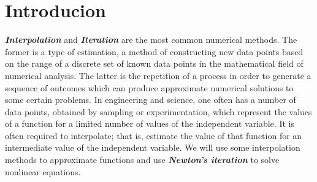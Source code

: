 \documentclass[a4paper,11pt]{article}
\begin{document}
\section{Introducion}
\textit{\textbf{Interpolation}} and \textit{\textbf{Iteration}} are the most common numerical methods. The former is a type of estimation, a method of constructing new data points based on the range of a discrete set of known data points in the mathematical field of numerical analysis. The latter is the repetition of a process in order to generate a sequence of outcomes which can produce approximate numerical solutions to some certain problems. In engineering and science, one often has a number of data points, obtained by sampling or experimentation, which represent the values of a function for a limited number of values of the independent variable. It is often required to interpolate; that is, estimate the value of that function for an intermediate value of the independent variable. We will use some interpolation methods to approximate functions and use \textit{\textbf{Newton's iteration}} to solve nonlinear equations.
\end{document}
